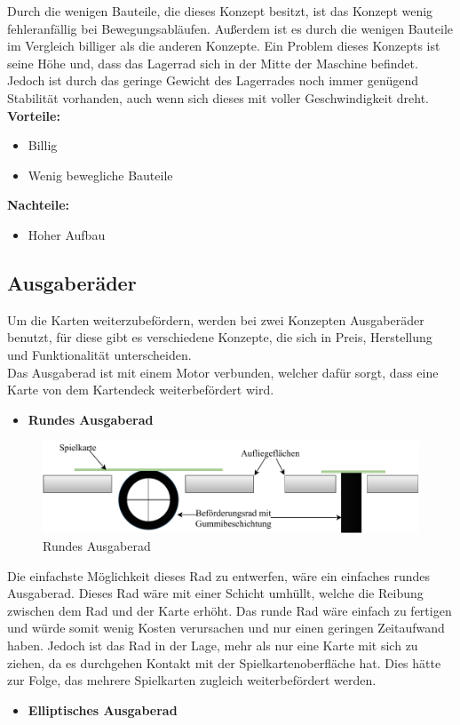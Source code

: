 Durch die wenigen Bauteile, die dieses Konzept besitzt, ist das Konzept wenig fehleranfällig bei Bewegungsabläufen.
Außerdem ist es durch die wenigen Bauteile im Vergleich billiger als die anderen Konzepte.
Ein Problem dieses Konzepts ist seine Höhe und, dass das Lagerrad sich in der Mitte der Maschine befindet.
Jedoch ist durch das geringe Gewicht des Lagerrades noch immer genügend Stabilität vorhanden, auch wenn sich dieses mit voller Geschwindigkeit dreht. \\

\textbf{Vorteile:}
\begin{itemize}
    \item Billig
    \item Wenig bewegliche Bauteile
\end{itemize}
\textbf{Nachteile:}
\begin{itemize}
    \item Hoher Aufbau
\end{itemize}

\subsection{Ausgaberäder}
Um die Karten weiterzubefördern, werden bei zwei Konzepten Ausgaberäder benutzt, für diese gibt es verschiedene Konzepte, die sich in Preis, Herstellung und Funktionalität unterscheiden.\\
Das Ausgaberad ist mit einem Motor verbunden, welcher dafür sorgt, dass eine Karte von dem Kartendeck weiterbefördert wird.
\begin{itemize}
    \item \textbf{Rundes Ausgaberad}
\end{itemize}

\begin{figure}[H]
    \centering
    \includegraphics[scale=0.9,page=1]{fig/mech/RundesAusgaberad-Page-1}
    \caption{Rundes Ausgaberad}
\end{figure}

Die einfachste Möglichkeit dieses Rad zu entwerfen, wäre ein einfaches rundes Ausgaberad.
Dieses Rad wäre mit einer Schicht umhüllt, welche die Reibung zwischen dem Rad und der Karte erhöht.
Das runde Rad wäre einfach zu fertigen und würde somit wenig Kosten verursachen und nur einen geringen Zeitaufwand haben.
Jedoch ist das Rad in der Lage, mehr als nur eine Karte mit sich zu ziehen, da es durchgehen Kontakt mit der Spielkartenoberfläche hat.
Dies hätte zur Folge, das mehrere Spielkarten zugleich weiterbefördert werden.
\newpage
\begin{itemize}
    \item \textbf{Elliptisches Ausgaberad}
\end{itemize}

